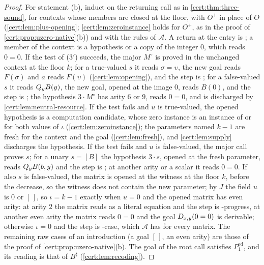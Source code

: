 \begin{proof}
For statement (b), induct on the returning call as in \cref{cert:thm:three-sound}, for contexts
whose members are closed at the floor, with $O^{+}$ in place of $O$
(\cref{cert:lem:plus-opening}; \cref{cert:lem:zeroinstance} holds for $O^{+}$, as in
the proof of \cref{cert:prop:uzero-native}(b)) and with the rules of $\mathcal A$. A
return at the entry is ; a member of the context is a hypothesis or a
copy of the integer $0$, which reads $0=0$. If the test of ($3'$) succeeds, the
major $M^{\circ}$ is proved in the unchanged context at the floor $k$; for a
true-valued $s$ it reads $\sigma=\upsilon$, the new goal reads $F(\sigma)$ and $a$
reads $F(\upsilon)$ (\cref{cert:lem:opening}), and the step is ; for a
false-valued $s$ it reads $Q_{y}B(y)$, the new goal, opened at the image $0$, reads
$B(0)$, and the step is ; the hypothesis $3\cdot M^{\circ}$ has arity
$6$ or $9$, reads $0=0$, and is discharged by \cref{cert:lem:neutral-resource}. If
the test fails and $u$ is true-valued, the opened hypothesis is a computation
candidate, whose zero instance is an instance of  or  for
both values of $\iota$ (\cref{cert:lem:zeroinstance}); the parameters named $k-1$ are
fresh for the context and the goal (\cref{cert:lem:fresh}), and
\cref{cert:lem:supply} discharges the hypothesis. If the test fails and $u$ is
false-valued, the major call proves $s$; for a unary $s=[B]$ the hypothesis
$3\cdot s$, opened at the fresh parameter, reads $Q_{y}B(b,y)$ and the step is
; at another arity or a scalar it reads $0=0$. If also $s$ is
false-valued, the matrix is opened at the witness at the floor $k$, before the
decrease, so the witness does not contain the new parameter; by $J$ the field $u$ is
$0$ or $[\,]$, so $\iota=k-1$ exactly when $u=0$ and the opened matrix has even
arity: at arity $2$ the matrix reads as a literal equation and the step is
-progress, at another even arity the matrix reads $0=0$ and the goal
$D_{x,y}(0=0)$ is derivable; otherwise $\iota=0$ and the step is -case,
which $\mathcal A$ has for every matrix. The remaining raw cases of an introduction
(a goal $[\,]$, an even arity) are those of the proof of
\cref{cert:prop:uzero-native}(b). The goal of the root call satisfies
$P^{\mathrm{ed}}_{1}$, and its reading is that of $B^{\sharp}$
(\cref{cert:lem:recoding}).


\end{proof}
